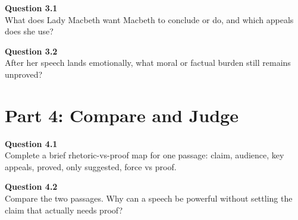 \documentclass[12pt]{article}
\begin{document}
\textbf{Question 3.1}\\[-0.15em]
What does Lady Macbeth want Macbeth to conclude or do, and which appeals does she use?


\textbf{Question 3.2}\\[-0.15em]
After her speech lands emotionally, what moral or factual burden still remains unproved?


\newpage

\section*{Part 4: Compare and Judge}

\textbf{Question 4.1}\\[-0.15em]
Complete a brief rhetoric-vs-proof map for one passage: claim, audience, key appeals, proved, only suggested, force vs proof.


\textbf{Question 4.2}\\[-0.15em]
Compare the two passages. Why can a speech be powerful without settling the claim that actually needs proof?

\end{document}
